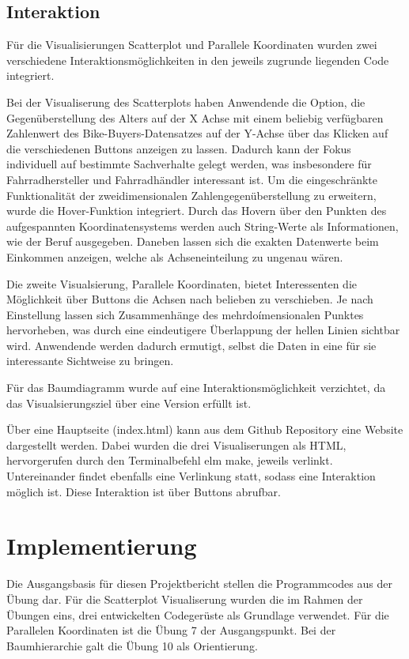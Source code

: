 \documentclass[usegeometry=true]{scrartcl}
\begin{document}
\subsection{Interaktion}
Für die Visualisierungen Scatterplot und Parallele Koordinaten wurden zwei verschiedene Interaktionsmöglichkeiten in den jeweils zugrunde liegenden Code integriert. 

Bei der Visualiserung des Scatterplots haben Anwendende die Option, die Gegenüberstellung des Alters auf der X Achse mit einem beliebig verfügbaren Zahlenwert des Bike-Buyers-Datensatzes auf der Y-Achse  über das Klicken auf die verschiedenen Buttons anzeigen zu lassen. Dadurch kann der Fokus individuell auf bestimmte Sachverhalte gelegt werden, was insbesondere für Fahrradhersteller und Fahrradhändler interessant ist. Um die eingeschränkte Funktionalität der zweidimensionalen Zahlengegenüberstellung zu erweitern, wurde die Hover-Funktion integriert. Durch das Hovern über den Punkten des aufgespannten Koordinatensystems werden auch String-Werte als Informationen, wie der Beruf ausgegeben. Daneben lassen sich die exakten Datenwerte beim Einkommen anzeigen, welche als Achseneinteilung zu ungenau wären. 

Die zweite Visualsierung, Parallele Koordinaten, bietet Interessenten die Möglichkeit über Buttons die Achsen nach belieben zu verschieben. Je nach Einstellung lassen sich Zusammenhänge des mehrdoímensionalen Punktes hervorheben, was durch eine eindeutigere Überlappung der hellen Linien sichtbar wird. Anwendende werden dadurch ermutigt, selbst die Daten in eine für sie interessante Sichtweise zu bringen. 

Für das Baumdiagramm wurde auf eine Interaktionsmöglichkeit verzichtet, da das Visualsierungsziel über eine Version erfüllt ist. 

Über eine Hauptseite (index.html) kann aus dem Github Repository eine Website dargestellt werden. Dabei wurden die drei Visualiserungen als HTML, hervorgerufen durch  den Terminalbefehl elm make, jeweils verlinkt. Untereinander findet ebenfalls eine Verlinkung statt, sodass eine Interaktion möglich ist. Diese Interaktion ist über Buttons abrufbar. 

\section{Implementierung}
Die Ausgangsbasis für diesen Projektbericht stellen die Programmcodes aus der Übung dar. Für die Scatterplot Visualiserung wurden die im Rahmen der Übungen eins, drei entwickelten Codegerüste als Grundlage verwendet. Für die Parallelen Koordinaten ist die Übung 7 der Ausgangspunkt. Bei der Baumhierarchie galt die Übung 10 als Orientierung. 
\end{document}
